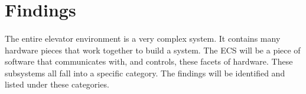 \documentclass[12pt]{article}
\begin{document}
\section{Findings}
\paragraph{}
The entire elevator environment is a very complex system. It contains many hardware pieces that work together to build a system. The ECS will be a piece of software that communicates with, and controls, these facets of hardware. These subsystems all fall into a specific category. The findings will be identified and listed under these categories.
\end{document}
